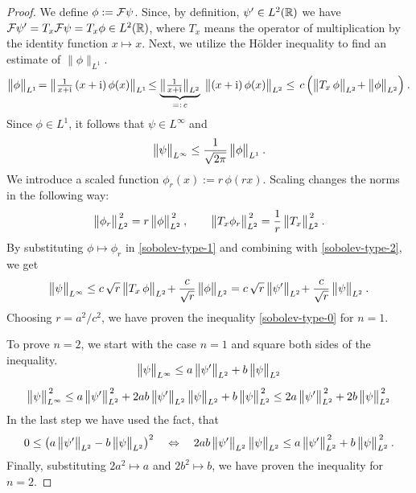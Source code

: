 \begin{proof}
	We define $\phi := \mathcal{F} \psi$. Since, by definition, $\psi' \in L^2(\mathbb{R})$ we have $\mathcal{F} \psi' = T_x \mathcal{F} \psi = T_x \phi \in L^2(\mathbb{R})$, where $T_x$ means the operator of multiplication by the identity function $x \mapsto x$. Next, we utilize the Hölder inequality to find an estimate of $\lVert\phi\rVert_{L^1}$.
	\begin{equation}
		\big\lVert \phi \big\rVert_{L^1}
		\!=
		\big\lVert \tfrac{1}{x+\mathrm{i}} \, (x+\mathrm{i}) \, \phi(x)  \big\rVert_{L^1}
		\!\leq \underbrace{ \big\lVert \tfrac{1}{x+\mathrm{i}} \big\rVert_{L^2} }_{=: \, c}
		\; \big\lVert (x+\mathrm{i}) \, \phi(x) \big\rVert_{L^2}
		\leq \,c\, \Big(
			\big\lVert T_x \, \phi \big\rVert_{L^2} \!+
			\big\lVert \phi \big\rVert_{L^2}
		\Big)
		\: .
		\label{sobolev-type-1}
	\end{equation}
	Since $\phi \in L^1$, it follows that $\psi \in L^\infty$ and
	\begin{equation}
		\big\lVert \psi \big\rVert_{L^\infty}
		\leq \frac{1}{\sqrt{2\pi}} \,
		\big\lVert \phi \big\rVert_{L^1}
		\: .
		\label{sobolev-type-2}
	\end{equation}
	We introduce a scaled function $\phi_r(x) := r \, \phi(r x)$. Scaling changes the norms in the following way:
	\begin{gather*}
		\big\lVert \phi_r \big\rVert_{L^2}^{\,2}
		= r \, \big\lVert \phi \big\rVert_{L^2}^{\,2}
		\: ,
		\qquad
		\big\lVert T_x \phi_r \big\rVert_{L^2}^{\,2}
		= \frac{1}{r} \, \big\lVert T_x \big\rVert_{L^2}^{\,2}
		\: .
	\end{gather*}
	By substituting $\phi \mapsto \phi_r$ in \eqref{sobolev-type-1} and combining with \eqref{sobolev-type-2}, we get
	\begin{gather*}
		\big\lVert \psi \big\rVert_{L^\infty}
		\leq
		c \, \sqrt{r} \, \big\lVert T_x \, \phi \big\rVert_{L^2} \!+
		\frac{c}{\sqrt{r}} \, \big\lVert \phi \big\rVert_{L^2}
		=
		c \, \sqrt{r} \, \big\lVert \psi' \big\rVert_{L^2} \!+
		\frac{c}{\sqrt{r}} \, \big\lVert \psi \big\rVert_{L^2}
		\: .
	\end{gather*}
	Choosing $r = a^2/c^2$, we have proven the inequality \eqref{sobolev-type-0} for $n=1$.

	To prove $n=2$, we start with the case $n=1$ and square both sides of the inequality.
	\begin{gather*}
		\\[-1.7\baselineskip]
		\big\lVert \psi \big\rVert_{L^\infty}
		\leq
		a \, \big\lVert \psi' \big\rVert_{L^2}
		+ b \, \big\lVert \psi \big\rVert_{L^2}
		\\[5pt]
		\big\lVert \psi \big\rVert_{L^\infty}^{\,2}
		\leq
		a \, \big\lVert \psi' \big\rVert_{L^2}^{\,2}
		+ 2ab \, \big\lVert \psi' \big\rVert_{L^2} \, \big\lVert \psi \big\rVert_{L^2}
		+ b \, \big\lVert \psi \big\rVert_{L^2}^{\,2}
		\leq
		2a \, \big\lVert \psi' \big\rVert_{L^2}^{\,2}
		+ 2b \, \big\lVert \psi \big\rVert_{L^2}^{\,2}
	\end{gather*}
	In the last step we have used the fact, that
	\begin{equation*}
		0 \leq
		\big( a\, \big\lVert \psi' \big\rVert_{L^2} - b\, \big\lVert \psi \big\rVert_{L^2} \big)^2
		\quad \Leftrightarrow \quad
		2ab \, \big\lVert \psi' \big\rVert_{L^2} \, \big\lVert \psi \big\rVert_{L^2}
		\leq
		a \, \big\lVert \psi' \big\rVert_{L^2}^{\,2}
		+ b \, \big\lVert \psi \big\rVert_{L^2}^{\,2}
		\: .
	\end{equation*}
	Finally, substituting $2a^2 \mapsto a$ and $2b^2 \mapsto b$, we have proven the inequality for~${n=2}$.
\end{proof}